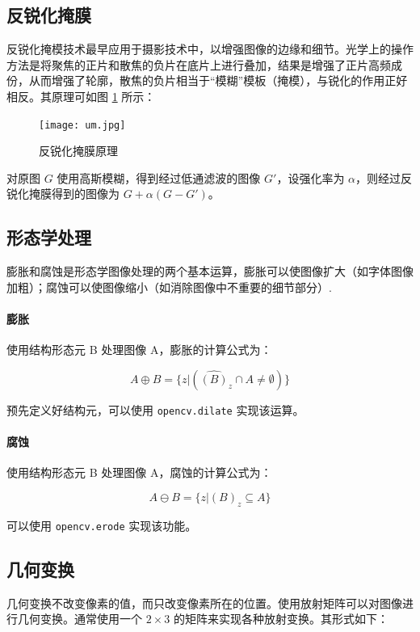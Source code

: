 \documentclass[11pt]{ctexart}
\begin{document}
\subsection{反锐化掩膜}

反锐化掩模技术最早应用于摄影技术中，以增强图像的边缘和细节。光学上的操作方法是将聚焦的正片和散焦的负片在底片上进行叠加，结果是增强了正片高频成份，从而增强了轮廓，散焦的负片相当于“模糊”模板（掩模），与锐化的作用正好相反。其原理可如图 \ref{um} 所示：

\begin{figure}[htbp]
    \centering
    \texttt{[image: um.jpg]}
    \caption{反锐化掩膜原理}
    \label{um}
\end{figure}

对原图 $G$ 使用高斯模糊，得到经过低通滤波的图像 $G'$，设强化率为 $\alpha$，则经过反锐化掩膜得到的图像为 $G + \alpha (G - G')$。

\subsection{形态学处理}

膨胀和腐蚀是形态学图像处理的两个基本运算，膨胀可以使图像扩大（如字体图像加粗）；腐蚀可以使图像缩小（如消除图像中不重要的细节部分）.

\paragraph{膨胀} 使用结构形态元 B 处理图像 A，膨胀的计算公式为：

$$
A \oplus B = \{z | (\hat{(B)}_z \cap A \ne \emptyset ) \}
$$

预先定义好结构元，可以使用 \texttt{opencv.dilate} 实现该运算。

\paragraph{腐蚀} 使用结构形态元 B 处理图像 A，腐蚀的计算公式为：

$$
A \ominus B = \{z | (B)_z \subseteq A \}
$$

可以使用 \texttt{opencv.erode} 实现该功能。


\subsection{几何变换}

几何变换不改变像素的值，而只改变像素所在的位置。使用放射矩阵可以对图像进行几何变换。通常使用一个 $2 \times 3$ 的矩阵来实现各种放射变换。其形式如下：
\end{document}
